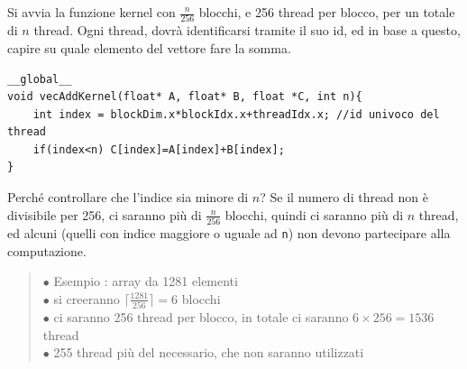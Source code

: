 \documentclass[10pt, letterpaper]{report}
\begin{document}
Si avvia la funzione kernel  con $\frac{n}{256}$ blocchi, e 256 thread per blocco, per un totale di $n$ thread. Ogni thread, dovrà identificarsi tramite il suo id, ed in base a questo, capire su quale elemento del vettore fare la somma.
\begin{lstlisting}[style=CStyle]
__global__ 
void vecAddKernel(float* A, float* B, float *C, int n){
    int index = blockDim.x*blockIdx.x+threadIdx.x; //id univoco del thread 
    if(index<n) C[index]=A[index]+B[index];
}
\end{lstlisting}
Perché controllare che l'indice sia minore di $n$? Se il numero di thread non è divisibile per 256, ci saranno più di $\frac{n}{256}$ blocchi, quindi ci saranno più di $n$ thread, ed alcuni (quelli con indice maggiore o uguale ad \texttt{n}) non devono partecipare alla computazione.
\begin{quote}
    $\bullet$ Esempio : array da 1281 elementi\\ 
    $\bullet$ si creeranno $\lceil \frac{1281}{256}\rceil =6$ blocchi \\
    $\bullet$ ci saranno 256 thread per blocco, in totale ci saranno $6\times 256=1536$ thread\\
    $\bullet$ 255 thread più del necessario, che non saranno utilizzati
\end{quote}
\end{document}

